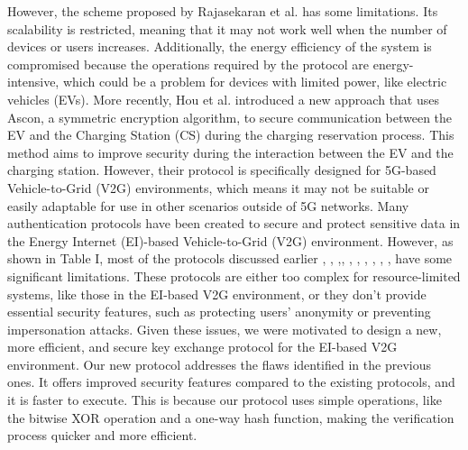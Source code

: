 \documentclass[3p,times,onecolumn]{elsarticle}
\begin{document}
 However, the scheme proposed by Rajasekaran et al. \cite{GT15} has some limitations. Its scalability is restricted, meaning that it may not work well when the number of devices or users increases. Additionally, the energy efficiency of the system is compromised because the operations required by the protocol are energy-intensive, which could be a problem for devices with limited power, like electric vehicles (EVs).
More recently, Hou et al. \cite{GT16} introduced a new approach that uses Ascon, a symmetric encryption algorithm, to secure communication between the EV and the Charging Station (CS) during the charging reservation process. This method aims to improve security during the interaction between the EV and the charging station. However, their protocol is specifically designed for 5G-based Vehicle-to-Grid (V2G) environments, which means it may not be suitable or easily adaptable for use in other scenarios outside of 5G networks.
Many authentication protocols have been created to secure and protect sensitive data in the Energy Internet (EI)-based Vehicle-to-Grid (V2G) environment. However, as shown in Table I, most of the protocols discussed earlier \cite{GT6},\cite{GT7} , \cite{GT8},\cite{GT9}, \cite{GT10}, \cite{GT11}, \cite{GT12}, \cite{GT13}, \cite{GT14}, \cite{GT15}, \cite{GT16} have some significant limitations. These protocols are either too complex for resource-limited systems, like those in the EI-based V2G environment, or they don't provide essential security features, such as protecting users' anonymity or preventing impersonation attacks.
Given these issues, we were motivated to design a new, more efficient, and secure key exchange protocol for the EI-based V2G environment. Our new protocol addresses the flaws identified in the previous ones. It offers improved security features compared to the existing protocols, and it is faster to execute. This is because our protocol uses simple operations, like the bitwise XOR operation and a one-way hash function, making the verification process quicker and more efficient.
\end{document}
